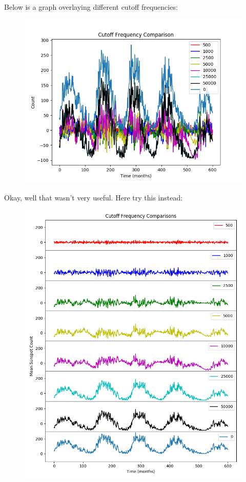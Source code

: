 \documentclass[12pt]{article}
\begin{document}
Below is a graph overlaying different cutoff frequencies:

\begin{figure}[H]
\begin{center}
\includegraphics[scale=0.8]{ugly.png}
\end{center}
\end{figure}


Okay, well that wasn't very useful. Here try this instead:

\begin{figure}[H]
\begin{center}
\includegraphics[scale=0.8]{freqs.png}
\end{center}
\end{figure}
\end{document}
